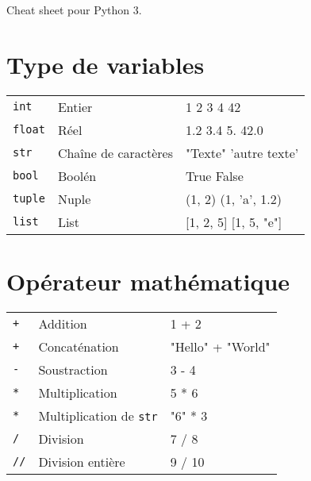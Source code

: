 \documentclass[10pt,a4paper,landscape]{article}
\newcommand*\keystroke[1]{%
  \tikz[baseline=(key.base)]
    \node[%
      draw,
      fill=white,
      drop shadow={shadow xshift=0.25ex,shadow yshift=-0.25ex,fill=black,opacity=0.75},
      rectangle,
      rounded corners=2pt,
      inner sep=1pt,
      line width=0.5pt,
      font=\scriptsize\sffamily
    ](key) {~#1~\strut}
  ;
}
\renewcommand{\familydefault}{\sfdefault}
\begin{document}

\newcommand{\ret}{\keystroke{$\hookleftarrow$}}
\newcommand{\shift}{\keystroke{$\Uparrow~$}}
\newcommand{\alt}{\keystroke{Alt}}
\newcommand{\up}{\keystroke{$\uparrow$}}
\newcommand{\down}{\keystroke{$\downarrow$}}
\newcommand{\bkspc}{\keystroke{$\longmapsfrom$}}
\newcommand{\ctrl}[1]{\texttt{\keystroke{Ctrl}#1}}
\newcommand{\codeintext}[1]{\texttt{#1}}
\raggedright



\begin{multicols}{2}

\begin{LARGE}

Cheat sheet pour Python 3.
\end{LARGE}


\section{Type de variables}
\begin{tabular}{p{3cm}p{4cm}p{\linewidth - 8.25cm}}
\codeintext{int} & Entier & 1 2 3 4 42 \\
\codeintext{float} & R\'eel & 1.2 3.4 5. 42.0 \\
\codeintext{str} & Cha\^ine de caract\`eres & "Texte" 'autre texte'\\
\codeintext{bool} & Bool\'en & True False \\
\codeintext{tuple} & Nuple & (1, 2) (1, 'a', 1.2)\\
\codeintext{list} & List & [1, 2, 5] [1, 5, "e"]\\
\end{tabular}

\section{Opérateur math\'ematique}
\begin{tabular}{p{3cm}p{4cm}p{\linewidth - 8.25cm}}
\codeintext{+} & Addition & 1 + 2\\
\codeintext{+} & Concaténation & "Hello" + "World"\\
\codeintext{-} & Soustraction & 3 - 4\\
\codeintext{*} & Multiplication & 5 * 6\\
\codeintext{*} & Multiplication de \codeintext{str} & "6" * 3\\
\codeintext{/} & Division & 7 / 8\\
\codeintext{//} & Division enti\`ere & 9 / 10\\
\end{tabular}


\end{multicols}
\end{document}
